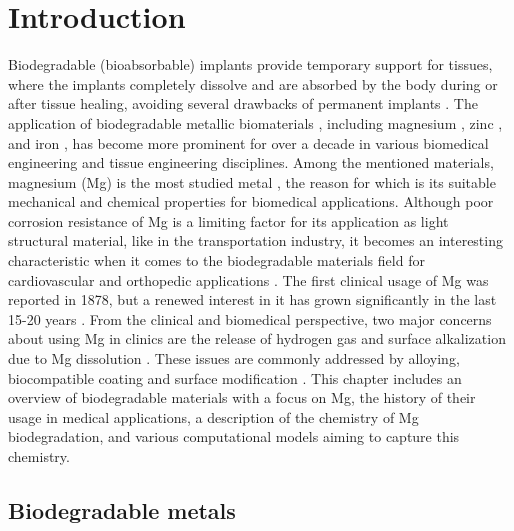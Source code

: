 \chapter{Introduction}\label{ch:introduction}


Biodegradable (bioabsorbable) implants provide temporary support for tissues, where the implants completely dissolve and are absorbed by the body during or after tissue healing, avoiding several drawbacks of permanent implants \cite{Gao2022}. The application of biodegradable metallic biomaterials \cite{Zheng2014, Liu2019, Han2019}, including magnesium \cite{Zhao2017,Zhen2013,Willumeit-Roemer2019}, zinc \cite{Venezuela2019,Mostaed2018}, and iron \cite{Schinhammer2010}, has become more prominent for over a decade in various biomedical engineering and tissue engineering disciplines. Among the mentioned materials, magnesium (Mg) is the most studied metal \cite{Esmaily2017}, the reason for which is its suitable mechanical and chemical properties for biomedical applications. Although poor corrosion resistance of Mg is a limiting factor for its application as light structural material, like in the transportation industry, it becomes an interesting characteristic when it comes to the biodegradable materials field for cardiovascular and orthopedic applications \cite{Heublein2003,Staiger2006,Walker2014}. The first clinical usage of Mg was reported in 1878, but a renewed interest in it has grown significantly in the last 15-20 years \cite{Esmaily2017}. From the clinical and biomedical perspective, two major concerns about using Mg in clinics are the release of hydrogen gas and surface alkalization due to Mg dissolution \cite{Cecchinato2015}. These issues are commonly addressed by alloying, biocompatible coating and surface modification \cite{Esmaily2017}. This chapter includes an overview of biodegradable materials with a focus on Mg, the history of their usage in medical applications, a description of the chemistry of Mg biodegradation, and various computational models aiming to capture this chemistry.

\section{Biodegradable metals}

